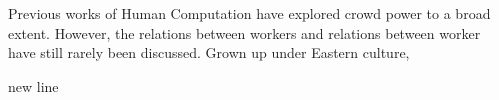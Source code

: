 \noindent
Previous works of Human Computation have explored crowd power to a broad extent.
However, the relations between workers and relations between worker have still rarely been discussed. 
Grown up under Eastern culture,  






new line\\




